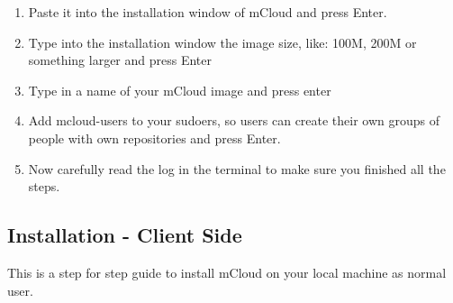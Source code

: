 \documentclass{article}
\begin{document}
\begin{enumerate}
    \item Paste it into the installation window of mCloud and press Enter.
    
    \item Type into the installation window the image size, like: 100M, 200M or something larger and press Enter
    
    \item Type in a name of your mCloud image and press enter

    \item Add mcloud-users to your sudoers, so users can create their own groups of people with own repositories and press Enter.
    
    \item Now carefully read the log in the terminal to make sure you finished all the steps. 
    
\end{enumerate}


\subsection{Installation - Client Side}
This is a step for step guide to install mCloud on your local machine as normal user.
\end{document}
